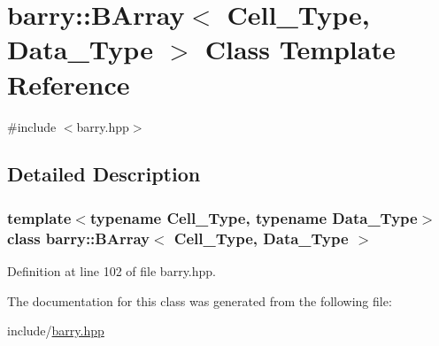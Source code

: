 \hypertarget{classbarry_1_1_b_array}{}\section{barry\+:\+:B\+Array$<$ Cell\+\_\+\+Type, Data\+\_\+\+Type $>$ Class Template Reference}
\label{classbarry_1_1_b_array}


{\ttfamily \#include $<$barry.\+hpp$>$}



\subsection{Detailed Description}
\subsubsection*{template$<$typename Cell\+\_\+\+Type, typename Data\+\_\+\+Type$>$\newline
class barry\+::\+B\+Array$<$ Cell\+\_\+\+Type, Data\+\_\+\+Type $>$}



Definition at line 102 of file barry.\+hpp.



The documentation for this class was generated from the following file\+:\begin{DoxyCompactItemize}
\item 
include/\hyperlink{barry_8hpp}{barry.\+hpp}\end{DoxyCompactItemize}

